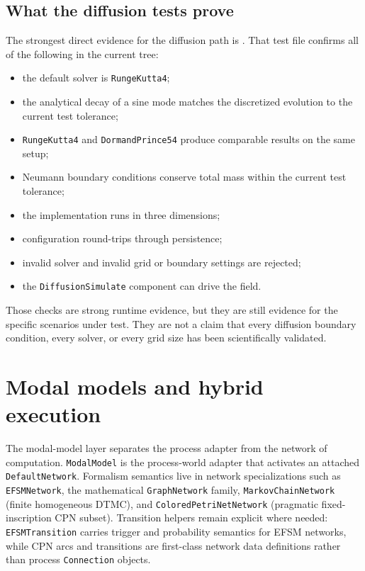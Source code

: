 \subsection{What the diffusion tests prove}
\label{subsec:diffusion-tests}

The strongest direct evidence for the diffusion path is
. That test file
confirms all of the following in the current tree:
\begin{itemize}
\item the default solver is \texttt{RungeKutta4};
\item the analytical decay of a sine mode matches the discretized evolution to
  the current test tolerance;
\item \texttt{RungeKutta4} and \texttt{DormandPrince54} produce comparable
  results on the same setup;
\item Neumann boundary conditions conserve total mass within the current test
  tolerance;
\item the implementation runs in three dimensions;
\item configuration round-trips through persistence;
\item invalid solver and invalid grid or boundary settings are rejected;
\item the \texttt{DiffusionSimulate} component can drive the field.
\end{itemize}

Those checks are strong runtime evidence, but they are still evidence for the
specific scenarios under test. They are not a claim that every diffusion
boundary condition, every solver, or every grid size has been scientifically
validated.

\section{Modal models and hybrid execution}
\label{sec:modal-and-hybrid-execution}

The modal-model layer separates the process adapter from the network of
computation. \texttt{ModalModel} is the process-world adapter that
activates an attached \texttt{DefaultNetwork}. Formalism semantics live in
network specializations such as \texttt{EFSMNetwork}, the mathematical
\texttt{GraphNetwork} family, \texttt{MarkovChainNetwork} (finite homogeneous
DTMC), and \texttt{ColoredPetriNetNetwork} (pragmatic fixed-inscription CPN
subset). Transition helpers remain explicit where needed:
\texttt{EFSMTransition} carries trigger and probability semantics for EFSM
networks, while CPN arcs and transitions are first-class network data
definitions rather than process \texttt{Connection} objects.

